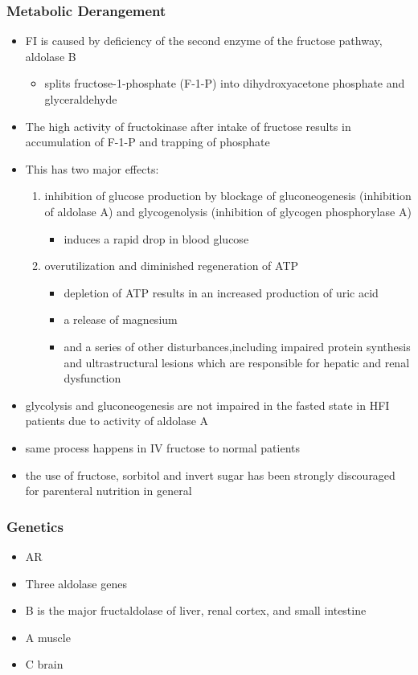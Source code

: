 \documentclass{scrartcl}
\begin{document}
\subsubsection{Metabolic Derangement}
\label{sec:orgb2f311e}
\begin{itemize}
\item FI is caused by deficiency of the second enzyme of the fructose pathway, aldolase B
\begin{itemize}
\item splits fructose-1-phosphate (F-1-P) into dihydroxyacetone phosphate and glyceraldehyde
\end{itemize}
\item The high activity of fructokinase after intake of fructose results in accumulation of F-1-P and trapping of phosphate
\item This has two major effects:
\begin{enumerate}
\item inhibition of glucose production by blockage of gluconeogenesis
(inhibition of aldolase A) and glycogenolysis (inhibition of glycogen phosphorylase A)
\begin{itemize}
\item induces a rapid drop in blood glucose
\end{itemize}
\item overutilization and diminished regeneration of ATP
\begin{itemize}
\item depletion of ATP results in an increased production of uric acid
\item a release of magnesium
\item and a series of other disturbances,including impaired protein
synthesis and ultrastructural lesions which are responsible for
hepatic and renal dysfunction
\end{itemize}
\end{enumerate}
\item glycolysis and gluconeogenesis are not impaired in the fasted state in HFI patients due to activity of aldolase A

\item same process happens in IV fructose to normal patients
\item the use of fructose, sorbitol and invert sugar has been strongly discouraged for parenteral nutrition in general
\end{itemize}

\subsubsection{Genetics}
\label{sec:org8c68f45}
\begin{itemize}
\item AR
\item Three aldolase genes
\item B is the major fructaldolase of liver, renal cortex, and small intestine
\item A muscle
\item C brain
\end{itemize}
\end{document}

